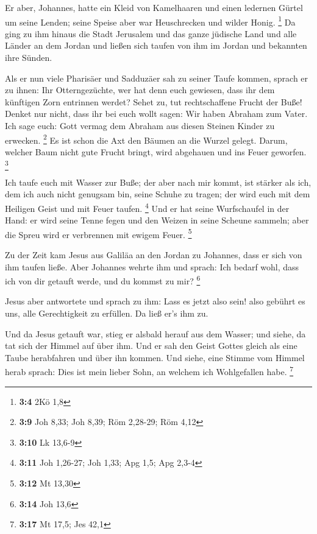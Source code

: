  Er aber, Johannes, hatte ein Kleid von Kamelhaaren und
einen ledernen Gürtel um seine Lenden; seine Speise aber war
Heuschrecken und wilder Honig. \footnote{\textbf{3:4} 2Kö 1,8}
 Da ging zu ihm hinaus die Stadt Jerusalem und das ganze
jüdische Land und alle Länder an dem Jordan  und ließen sich
taufen von ihm im Jordan und bekannten ihre Sünden.

 Als er nun viele Pharisäer und Sadduzäer sah zu seiner
Taufe kommen, sprach er zu ihnen: Ihr Otterngezüchte, wer hat denn euch
gewiesen, dass ihr dem künftigen Zorn entrinnen werdet? 
Sehet zu, tut rechtschaffene Frucht der Buße!  Denket nur
nicht, dass ihr bei euch wollt sagen: Wir haben Abraham zum Vater. Ich
sage euch: Gott vermag dem Abraham aus diesen Steinen Kinder zu
erwecken. \footnote{\textbf{3:9} Joh 8,33; Joh 8,39; Röm 2,28-29; Röm
  4,12}  Es ist schon die Axt den Bäumen an die Wurzel
gelegt. Darum, welcher Baum nicht gute Frucht bringt, wird abgehauen und
ins Feuer geworfen. \footnote{\textbf{3:10} Lk 13,6-9}

 Ich taufe euch mit Wasser zur Buße; der aber nach mir
kommt, ist stärker als ich, dem ich auch nicht genugsam bin, seine
Schuhe zu tragen; der wird euch mit dem Heiligen Geist und mit Feuer
taufen. \footnote{\textbf{3:11} Joh 1,26-27; Joh 1,33; Apg 1,5; Apg
  2,3-4}  Und er hat seine Wurfschaufel in der Hand: er
wird seine Tenne fegen und den Weizen in seine Scheune sammeln; aber die
Spreu wird er verbrennen mit ewigem Feuer. \footnote{\textbf{3:12} Mt
  13,30}

 Zu der Zeit kam Jesus aus Galiläa an den Jordan zu
Johannes, dass er sich von ihm taufen ließe.  Aber Johannes
wehrte ihm und sprach: Ich bedarf wohl, dass ich von dir getauft werde,
und du kommst zu mir? \footnote{\textbf{3:14} Joh 13,6}

 Jesus aber antwortete und sprach zu ihm: Lass es jetzt
also sein! also gebührt es uns, alle Gerechtigkeit zu erfüllen. Da ließ
er's ihm zu.

 Und da Jesus getauft war, stieg er alsbald herauf aus dem
Wasser; und siehe, da tat sich der Himmel auf über ihm. Und er sah den
Geist Gottes gleich als eine Taube herabfahren und über ihn kommen.
 Und siehe, eine Stimme vom Himmel herab sprach: Dies ist
mein lieber Sohn, an welchem ich Wohlgefallen habe. \footnote{\textbf{3:17}
  Mt 17,5; Jes 42,1}

